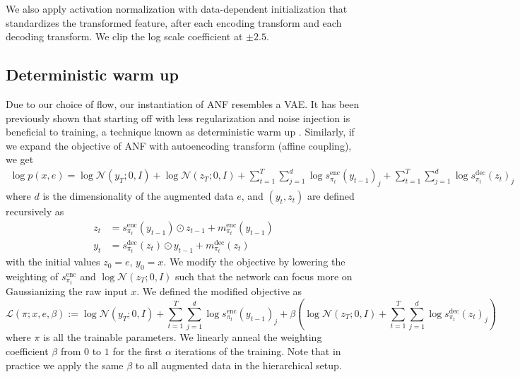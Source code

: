 \documentclass{article}
\def\gL{{\mathcal{L}}}
\def\gN{{\mathcal{N}}}
\begin{document}
We also apply activation normalization \citep{kingma2018glow} with data-dependent initialization that standardizes the transformed feature, after each encoding transform and each decoding transform. 
We clip the log scale coefficient at $\pm 2.5$.


\subsection{Deterministic warm up}
\label{app:warm}
Due to our choice of flow, our instantiation of ANF resembles a VAE. 
It has been previously shown that starting off with less regularization and noise injection is beneficial to training, a technique known as deterministic warm up \citep{raiko2007building,sonderby2016ladder}. 
Similarly, if we expand the objective of ANF with autoencoding transform (affine coupling), we get
\begin{align*}
\log p(x,e) = \log\gN(y_T; 0,I) + \log\gN(z_T; 0,I) + \sum_{t=1}^T \sum_{j=1}^{d} \log s_{\pi_t}^\text{enc}(y_{t-1})_j + \sum_{t=1}^T \sum_{j=1}^{d} \log s_{\pi_t}^\text{dec}(z_{t})_j 
\end{align*}
where $d$ is the dimensionality of the augmented data $e$, and $(y_t, z_t)$ are defined recursively as 
\begin{align*}
z_t &= s_{\pi_t}^\text{enc}(y_{t-1})\odot z_{t-1} + m_{\pi_t}^\text{enc}(y_{t-1}) \\
y_t &= s_{\pi_t}^\text{dec}(z_t)\odot y_{t-1} + m_{\pi_t}^\text{dec}(z_t)
\end{align*} 
with the initial values $z_0=e$, $y_0=x$.
We modify the objective by lowering the weighting of $s_{\pi_t}^\text{enc}$ and $\log\gN(z_T; 0,I)$ such that the network can focus more on Gaussianizing the raw input $x$. 
We defined the modified objective as
$$\gL(\pi; x,e,\beta):= 
\log\gN(y_T; 0,I) + \sum_{t=1}^T \sum_{j=1}^{d} \log s_{\pi_t}^\text{enc}(y_{t-1})_j + \beta\left(\log\gN(z_T; 0,I) + \sum_{t=1}^T \sum_{j=1}^{d} \log s_{\pi_t}^\text{dec}(z_{t})_j\right)$$
where $\pi$ is all the trainable parameters.
We linearly anneal the weighting coefficient $\beta$ from $0$ to $1$ for the first $\alpha$ iterations of the training.
Note that in practice we apply the same $\beta$ to all augmented data in the hierarchical setup. 




\newpage
\end{document}
